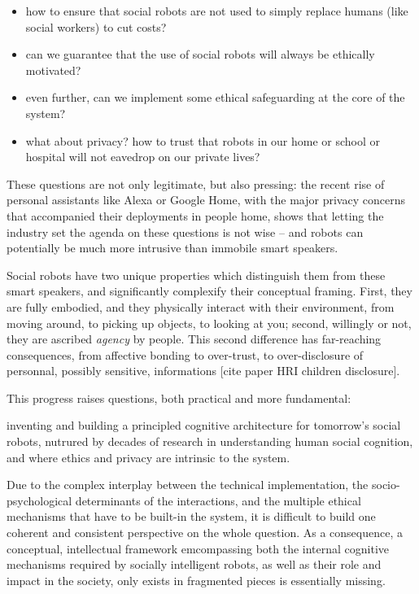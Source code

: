 \documentclass[]{article}
\begin{document}
\begin{itemize}
    \item how to ensure that social robots are not used to simply replace humans
        (like social workers) to cut costs?
    \item can we guarantee that the use of social robots will always be ethically motivated?
    \item even further, can we implement some ethical safeguarding at the core
        of the system?
    \item what about privacy? how to trust that robots in our home or school or
        hospital will not eavedrop on our private lives?
\end{itemize}

These questions are not only legitimate, but also pressing: the recent rise of
personal assistants like Alexa or Google Home, with the major privacy concerns
that accompanied their deployments in people home, shows that letting the
industry set the agenda on these questions is not wise -- and robots can
potentially be much more intrusive than immobile smart speakers.

Social robots have two unique properties which distinguish them from these smart
speakers, and significantly complexify their conceptual framing. First, they are
fully embodied, and they physically interact with their environment, from moving
around, to picking up objects, to looking at you; second, willingly or not, they
are ascribed \emph{agency} by people.  This second difference has far-reaching
consequences, from affective bonding to over-trust, to over-disclosure of
personnal, possibly sensitive, informations [cite paper HRI children
disclosure].



This progress raises questions, both practical and more fundamental:

inventing and building a principled cognitive architecture for tomorrow's social
robots, nutrured by decades of research in understanding human social cognition,
and where ethics and privacy are intrinsic to the system.

Due to the complex interplay between the technical implementation, the
socio-psychological determinants of the interactions, and the multiple ethical
mechanisms that have to be built-in the system, it is difficult to build one
coherent and consistent perspective on the whole question. As a consequence, a
conceptual, intellectual framework emcompassing both the internal cognitive
mechanisms required by socially intelligent robots, as well as their role and
impact in the society, only exists in fragmented pieces  is essentially missing.
\end{document}
